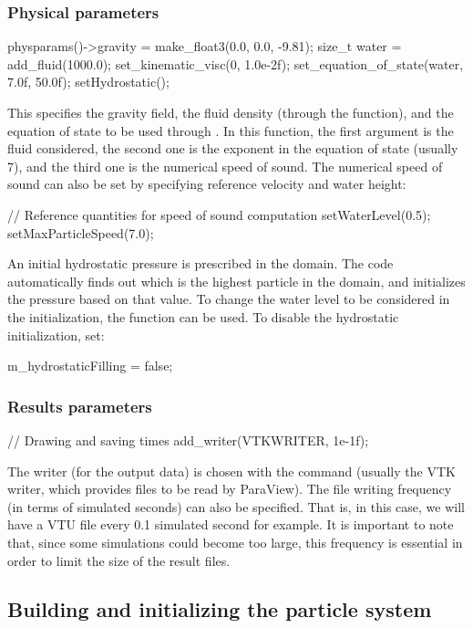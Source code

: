 \documentclass{../GPUSPHtemplate}
\begin{document}
\subsubsection{Physical parameters}
\begin{ccode}
physparams()->gravity = make_float3(0.0, 0.0, -9.81);
size_t water = add_fluid(1000.0);
set_kinematic_visc(0, 1.0e-2f);
set_equation_of_state(water, 7.0f, 50.0f);
setHydrostatic();
\end{ccode} 
This specifies the gravity field, the fluid density 
(through the  function),
and the equation of state to be used through .
In this function, the first argument is the fluid considered,
the second one is the exponent in the equation of state (usually 7),
and the third one is the numerical speed of sound.
The numerical speed of sound can also be set by specifying reference
velocity and water height:
\begin{ccode}
// Reference quantities for speed of sound computation
setWaterLevel(0.5);
setMaxParticleSpeed(7.0);
\end{ccode} 
An initial hydrostatic pressure is prescribed in the domain.
The code automatically finds out which is the highest
particle in the domain, and initializes the pressure based on that value.
To change the water level to be considered in the initialization, the function
 can be used. To disable the hydrostatic initialization, set:
\begin{ccode}
m_hydrostaticFilling = false;
\end{ccode} 

\subsubsection{Results parameters}
\begin{ccode}
  // Drawing and saving times
  add_writer(VTKWRITER, 1e-1f);
\end{ccode} 
The writer (for the output data) is chosen with the 
command (usually the VTK writer, which provides files to be read by ParaView).  
The file writing frequency (in terms of simulated seconds) can also be specified. 
That is, in this case, we will have a VTU file every 0.1 simulated second for example. 
It is important to note that, since some simulations could become 
too large, this frequency is essential in order to limit the size of the result files.\\


\subsection{Building and initializing the particle system}
\end{document}
